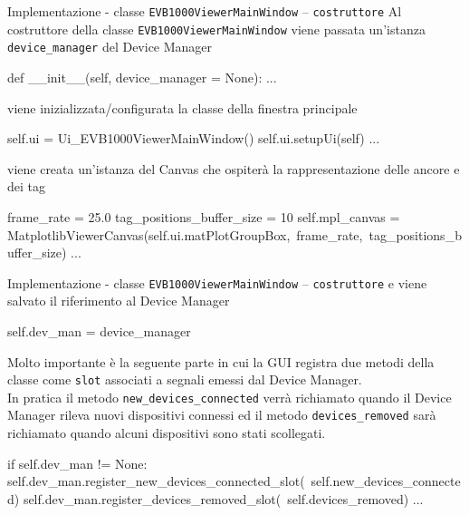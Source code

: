 \begin{frame}[fragile, shrink=15]{Implementazione - classe \lstinline!EVB1000ViewerMainWindow! -- \lstinline!costruttore!}
  Al costruttore della classe \lstinline!EVB1000ViewerMainWindow! viene passata
  un'istanza \lstinline!device_manager! del Device Manager
  \begin{Python}
    def __init__(self, device_manager = None):
        ...
  \end{Python}
  
  viene inizializzata/configurata la classe della finestra principale
  \begin{Python}
        self.ui = Ui_EVB1000ViewerMainWindow()
        self.ui.setupUi(self)
        ...
  \end{Python}

  viene creata un'istanza del Canvas che ospiterà la rappresentazione delle
  ancore e dei tag
  \begin{Python}
        frame_rate = 25.0
        tag_positions_buffer_size = 10
        self.mpl_canvas = MatplotlibViewerCanvas(self.ui.matPlotGroupBox,\
                                                 frame_rate,\
                                                 tag_positions_buffer_size)
        ...
  \end{Python}
\end{frame}

\begin{frame}[fragile, shrink=15]{Implementazione - classe \lstinline!EVB1000ViewerMainWindow! -- \lstinline!costruttore!}
  e viene salvato il riferimento al Device Manager 
  \begin{Python}
        self.dev_man = device_manager
  \end{Python}

  Molto \alert{importante} è la seguente parte in cui la GUI registra
  due metodi della classe come \lstinline!slot! associati a segnali emessi
  dal Device Manager.\\
  In pratica il metodo \lstinline!new_devices_connected! verrà richiamato quando il Device Manager
  rileva nuovi dispositivi connessi ed il metodo \lstinline!devices_removed! sarà richiamato
  quando alcuni dispositivi sono stati scollegati.
  \begin{Python}
        if self.dev_man != None:
            self.dev_man.register_new_devices_connected_slot(\
                         self.new_devices_connected)
            self.dev_man.register_devices_removed_slot(\
                         self.devices_removed)
        ...
  \end{Python}          

\end{frame}

